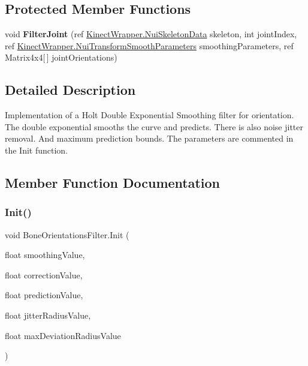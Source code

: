\subsection*{Protected Member Functions}
\begin{DoxyCompactItemize}
\item 
\mbox{\label{class_bone_orientations_filter_a9a5af74c297bb1815b24932aa6895786}} 
void {\bfseries Filter\+Joint} (ref \mbox{\hyperlink{struct_kinect_wrapper_1_1_nui_skeleton_data}{Kinect\+Wrapper.\+Nui\+Skeleton\+Data}} skeleton, int joint\+Index, ref \mbox{\hyperlink{struct_kinect_wrapper_1_1_nui_transform_smooth_parameters}{Kinect\+Wrapper.\+Nui\+Transform\+Smooth\+Parameters}} smoothing\+Parameters, ref Matrix4x4\mbox{[}$\,$\mbox{]} joint\+Orientations)
\end{DoxyCompactItemize}


\subsection{Detailed Description}
Implementation of a Holt Double Exponential Smoothing filter for orientation. The double exponential smooths the curve and predicts. There is also noise jitter removal. And maximum prediction bounds. The parameters are commented in the Init function. 



\subsection{Member Function Documentation}
\mbox{\label{class_bone_orientations_filter_a0cfdcfa52dc01bac029c04084dca64f2}} 
\subsubsection{\texorpdfstring{Init()}{Init()}}
{\footnotesize\ttfamily void Bone\+Orientations\+Filter.\+Init (\begin{DoxyParamCaption}\item[{float}]{smoothing\+Value,  }\item[{float}]{correction\+Value,  }\item[{float}]{prediction\+Value,  }\item[{float}]{jitter\+Radius\+Value,  }\item[{float}]{max\+Deviation\+Radius\+Value }\end{DoxyParamCaption})}



